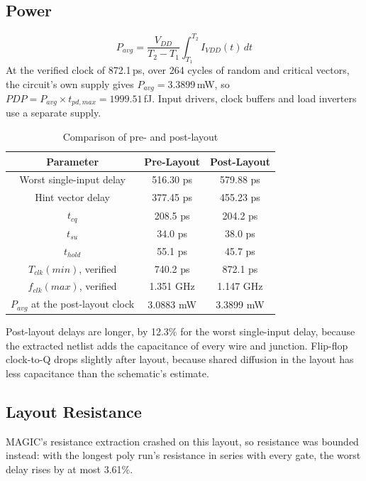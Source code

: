 \documentclass[conference,a4paper]{IEEEtran}
\begin{document}
\subsection{Power}
\[ P_{avg} = \frac{V_{DD}}{T_2 - T_1} \int_{T_1}^{T_2} I_{VDD}(t)\,dt \]
At the verified clock of 872.1\,ps, over 264 cycles of random and critical vectors, the circuit's own supply gives $P_{avg} = 3.3899$\,mW, so $PDP = P_{avg} \times t_{pd,max} = 1999.51$\,fJ. Input drivers, clock buffers and load inverters use a separate supply.

\begin{table}[H]\centering\footnotesize
\caption{Comparison of pre- and post-layout}
\label{tab:prepost}
\begin{tabular}{|c|c|c|}\hline
Parameter & Pre-Layout & Post-Layout \\ \hline
Worst single-input delay & 516.30 ps & 579.88 ps \\ \hline
Hint vector delay & 377.45 ps & 455.23 ps \\ \hline
$t_{cq}$ & 208.5 ps & 204.2 ps \\ \hline
$t_{su}$ & 34.0 ps & 38.0 ps \\ \hline
$t_{hold}$ & 55.1 ps & 45.7 ps \\ \hline
$T_{clk}(min)$, verified & 740.2 ps & 872.1 ps \\ \hline
$f_{clk}(max)$, verified & 1.351 GHz & 1.147 GHz \\ \hline
$P_{avg}$ at the post-layout clock & 3.0883 mW & 3.3899 mW \\ \hline
\end{tabular}
\end{table}

Post-layout delays are longer, by 12.3\% for the worst single-input delay, because the extracted netlist adds the capacitance of every wire and junction. Flip-flop clock-to-Q drops slightly after layout, because shared diffusion in the layout has less capacitance than the schematic's estimate.

\subsection{Layout Resistance}

MAGIC's resistance extraction crashed on this layout, so resistance was bounded instead: with the longest poly run's resistance in series with every gate, the worst delay rises by at most 3.61\%.
\end{document}

